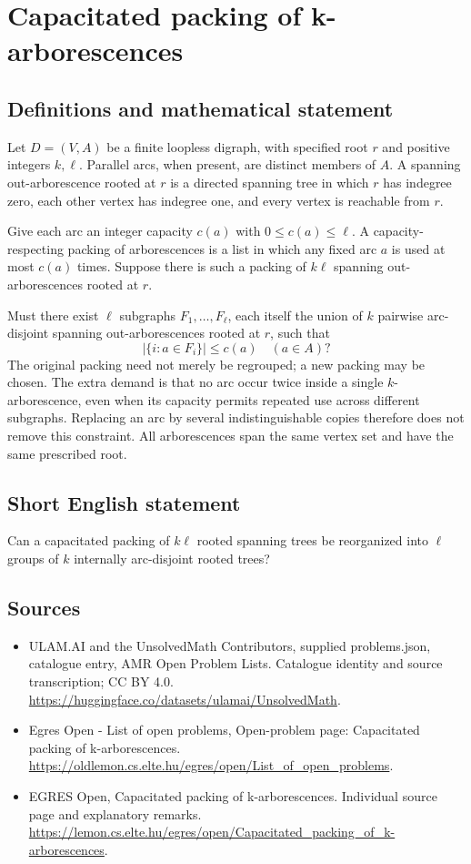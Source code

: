 \documentclass[11pt,a4paper]{article}
\begin{document}
\section*{Capacitated packing of k-arborescences}\label{statement}

\subsection{Definitions and mathematical statement}
Let $D=(V,A)$ be a finite loopless digraph, with specified root $r$ and
positive integers $k,\ell$. Parallel arcs, when present, are distinct
members of $A$. A spanning out-arborescence rooted at $r$ is a directed
spanning tree in which $r$ has indegree zero, each other vertex has
indegree one, and every vertex is reachable from $r$.

Give each arc an integer capacity $c(a)$ with $0\le c(a)\le\ell$.
A capacity-respecting packing of arborescences is a list in which any
fixed arc $a$ is used at most $c(a)$ times. Suppose there is such a
packing of $k\ell$ spanning out-arborescences rooted at $r$.

Must there exist $\ell$ subgraphs $F_1,\ldots,F_\ell$, each itself the
union of $k$ pairwise arc-disjoint spanning out-arborescences rooted at
$r$, such that
\[
                         |\{i:a\in F_i\}|\le c(a)
                                     \quad(a\in A)?
\]
The original packing need not merely be regrouped; a new packing may
be chosen. The extra demand is that no arc occur twice inside a single
$k$-arborescence, even when its capacity permits repeated use across
different subgraphs. Replacing an arc by several indistinguishable copies
therefore does not remove this constraint. All arborescences span the
same vertex set and have the same prescribed root.
\subsection{Short English statement}
Can a capacitated packing of $k\ell$ rooted spanning trees be
reorganized into $\ell$ groups of $k$ internally arc-disjoint rooted trees?
\subsection{Sources}
\begin{itemize}
\item[S1] ULAM.AI and the UnsolvedMath Contributors, supplied problems.json, catalogue entry, AMR Open Problem Lists. Catalogue identity and source transcription; CC BY 4.0.
\url{https://huggingface.co/datasets/ulamai/UnsolvedMath}.
\item[S2] Egres Open - List of open problems, Open-problem page: Capacitated packing of k-arborescences. 
\url{https://oldlemon.cs.elte.hu/egres/open/List_of_open_problems}.
\item[S3] EGRES Open, Capacitated packing of k-arborescences. Individual source page and explanatory remarks.
\url{https://lemon.cs.elte.hu/egres/open/Capacitated_packing_of_k-arborescences}.
\end{itemize}
\end{document}
